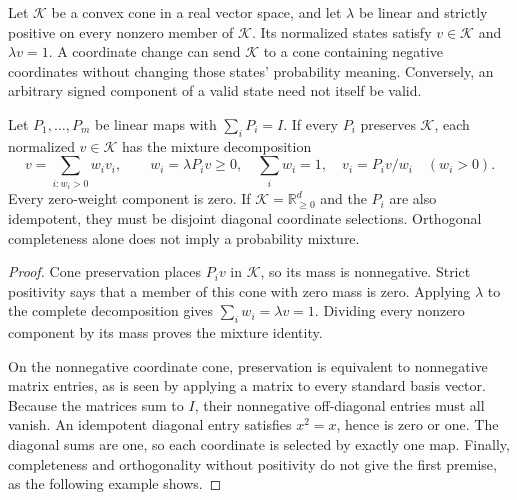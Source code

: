 Let $\mathcal K$ be a convex cone in a real vector space, and let $\lambda$ be linear and strictly positive on every nonzero member of $\mathcal K$. Its normalized states satisfy $v\in\mathcal K$ and $\lambda v=1$. A coordinate change can send $\mathcal K$ to a cone containing negative coordinates without changing those states' probability meaning. Conversely, an arbitrary signed component of a valid state need not itself be valid.

\begin{Coreproposition}\label{Core:r:positive-packets}
Let $P_1,\ldots,P_m$ be linear maps with $\sum_iP_i=I$. If every $P_i$ preserves $\mathcal K$, each normalized $v\in\mathcal K$ has the mixture decomposition
\[
 v=\sum_{i:w_i>0}w_i v_i,\qquad
 w_i=\lambda P_iv\ge0,\quad \sum_iw_i=1,\quad v_i=P_iv/w_i\quad(w_i>0).
\]
Every zero-weight component is zero. If $\mathcal K=\mathbb R^d_{\ge0}$ and the $P_i$ are also idempotent, they must be disjoint diagonal coordinate selections. Orthogonal completeness alone does not imply a probability mixture.
\end{Coreproposition}
\begin{proof}
Cone preservation places $P_iv$ in $\mathcal K$, so its mass is nonnegative. Strict positivity says that a member of this cone with zero mass is zero. Applying $\lambda$ to the complete decomposition gives $\sum_iw_i=\lambda v=1$. Dividing every nonzero component by its mass proves the mixture identity.

On the nonnegative coordinate cone, preservation is equivalent to nonnegative matrix entries, as is seen by applying a matrix to every standard basis vector. Because the matrices sum to $I$, their nonnegative off-diagonal entries must all vanish. An idempotent diagonal entry satisfies $x^2=x$, hence is zero or one. The diagonal sums are one, so each coordinate is selected by exactly one map. Finally, completeness and orthogonality without positivity do not give the first premise, as the following example shows.
\end{proof}

